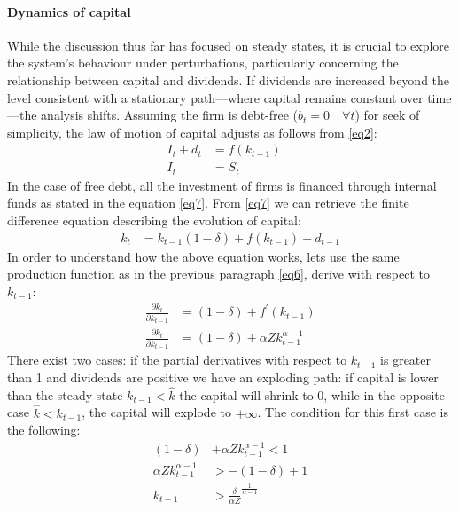 \documentclass[12pt]{article}
\begin{document}
\paragraph{Dynamics of capital}
While the discussion thus far has focused on steady states, it is crucial to explore the system's behaviour under
perturbations,  particularly concerning the relationship between capital and dividends. If dividends are increased
beyond the level consistent with a stationary path—where capital remains constant over time—the analysis shifts.
Assuming the firm is debt-free (\(b_t = 0 \quad \forall t\)) for seek of simplicity, the law of motion of capital adjusts
as follows from \ref{eq2}:
\begin{align}
    I_t + d_t &= f\left(k_{t-1}\right) \quad \\
    I_t &= S_t  \label{eq7}
\end{align}
In the case of free debt, all the investment of firms is financed through internal funds as stated in the equation
\ref{eq7}. From \ref{eq7} we can retrieve the finite difference equation describing the evolution of capital:
\begin{align}
    k_{t} &= k_{t-1} (1-\delta) + f\left(k_{t-1}\right) - d_{t-1}
\end{align}
In order to understand how the above equation works, lets use the same production function as in the previous paragraph
\ref{eq6}, derive with respect to \(k_{t-1}\):
\begin{align}
    \frac{\partial{k_t}}{\partial k_{t-1}} &= \left(1-\delta\right) + f^{\prime}\left(k_{t-1}\right) \\
    \frac{\partial{k_t}}{\partial k_{t-1}} &= \left(1-\delta\right) + \alpha Z k^{\alpha-1}_{t-1}  \label{eq8}
\end{align}
There exist two cases:
if the partial derivatives with respect to \(k_{t-1}\) is greater than 1 and dividends are positive we have an exploding
path: if capital is lower than the steady state \(k_{t-1} < \widehat{k}\) the capital will shrink to 0, while in the
opposite case \(\widehat{k} < k_{t-1}\), the capital will explode to \(+\infty\). The condition for this first case is
the following:
\begin{align}
    \left(1-\delta\right) &+ \alpha Z k^{\alpha-1}_{t-1} < 1 \\
    \alpha Z k^{\alpha-1}_{t-1} &> - \left(1-\delta\right) +1 \\
    k_{t-1} &> {\frac{\delta}{\alpha Z}}^{\frac{1}{\alpha - 1}}  \label{eq9}
\end{align}
\end{document}
